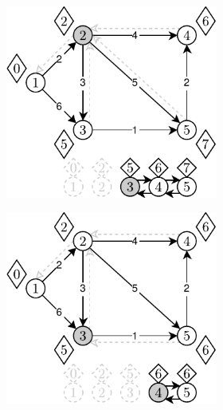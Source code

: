 \begin{figure}[!h]
\begin{subfigure}[b]{\textwidth}
\begin{subfigure}[b]{0.3\textwidth}
			\caption{}
			\label{fig:exapleDijkstraDLList:b}
		\end{subfigure}
		\hfill
		\begin{subfigure}[b]{0.3\textwidth}
			\includegraphics[width=\textwidth]{Chapter_II/DIJKSTRA-DLList/c.pdf}
			\caption{}
			\label{fig:exapleDijkstraDLList:c}
		\end{subfigure}
		\hfill\null
	\end{subfigure}
	\begin{subfigure}[b]{\textwidth}
		\null\hfill
		\begin{subfigure}[b]{0.3\textwidth}
			\includegraphics[width=\textwidth]{Chapter_II/DIJKSTRA-DLList/d.pdf}

\end{subfigure}
\end{subfigure}
\end{figure}
